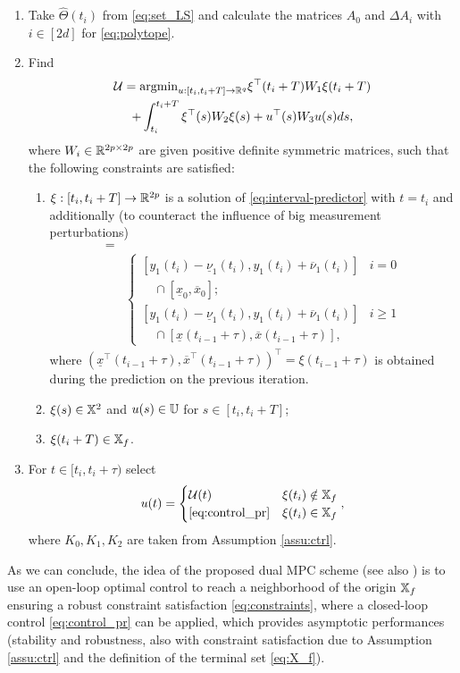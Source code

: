 \documentclass[letterpaper, 10 pt, conference]{ieeeconf}  %
\begin{document}
\begin{enumerate}
\item Take $\hat{\Theta}(t_{i})$ from \eqref{eq:set_LS} and calculate
the matrices $A_{0}$ and $\Delta A_{i}$ with $i\in[2d]$ for \eqref{eq:polytope}.
\item Find
\begin{gather}
\mathcal{U}=\text{argmin}_{u:[t_{i},t_{i}+T]\to\mathbb{R}^{q}}\xi^{\top}(t_{i}+T)W_{1}\xi(t_{i}+T)\label{eq:OCP}\\
+\int_{t_{i}}^{t_{i}+T}\xi^{\top}(s)W_{2}\xi(s)+u^{\top}(s)W_{3}u(s)ds,\nonumber 
\end{gather}
where $W_{i}\in\mathbb{R}^{2p\times2p}$ are given positive definite symmetric
matrices, such that the following constraints are satisfied: 
\begin{enumerate}
\item $\xi:[t_{i},t_{i}+T]\to\mathbb{R}^{2p}$ is a solution of \eqref{eq:interval-predictor}
with $t=t_{i}$ and additionally (to counteract the influence of big
measurement perturbations)
\begin{align}
[\underline{x}&(t_{i}),\overline{x}(t_{i})]=\label{eq:update}\\
&\begin{cases}
[y_{1}(t_{i})-\underline{\nu}_{1}(t_{i}),y_{1}(t_{i})+\overline{\nu}_{1}(t_{i})] & i=0\\
\quad\cap[\underline{x}_{0},\overline{x}_{0}];\\{}
[y_{1}(t_{i})-\underline{\nu}_{1}(t_{i}),y_{1}(t_{i})+\overline{\nu}_{1}(t_{i})] & i\geq1\\
\quad\cap[\underline{x}(t_{i-1}+\tau),\overline{x}(t_{i-1}+\tau)],
\end{cases}\nonumber
\end{align}
where $(\underline{x}^{\top}(t_{i-1}+\tau),\overline{x}^{\top}(t_{i-1}+\tau))^{\top}=\xi(t_{i-1}+\tau)$
is obtained during the prediction on the previous iteration.
\item $\xi(s)\in\mathbb{X}^{2}$ and $u(s)\in\mathbb{U}$ for $s\in[t_{i},t_{i}+T]$; 
\item $\xi(t_{i}+T)\in\mathbb{X}_{f}$.
\end{enumerate}
\item For $t\in[t_{i},t_{i}+\tau)$ select
\begin{equation}
u(t)=\begin{cases}
\mathcal{U}(t) & \xi(t_{i})\notin\mathbb{X}_{f}\\
\eqref{eq:control_pr} & \xi(t_{i})\in\mathbb{X}_{f}
\end{cases},\label{eq:control}
\end{equation}
where $K_{0},K_{1},K_{2}$ are taken from Assumption \ref{assu:ctrl}.
\end{enumerate}
As we can conclude, the idea of the proposed dual MPC scheme (see
also \cite{Michalska1993,MPC1,MPC:Tube2}) is to use an open-loop
optimal control to reach a neighborhood of the origin $\mathbb{X}_{f}$ ensuring
a robust constraint satisfaction \eqref{eq:constraints}, where a
closed-loop control \eqref{eq:control_pr} can be applied, which provides
asymptotic performances (stability and robustness, also with constraint
satisfaction due to Assumption \ref{assu:ctrl} and the definition
of the terminal set \eqref{eq:X_f}). 
\end{document}
